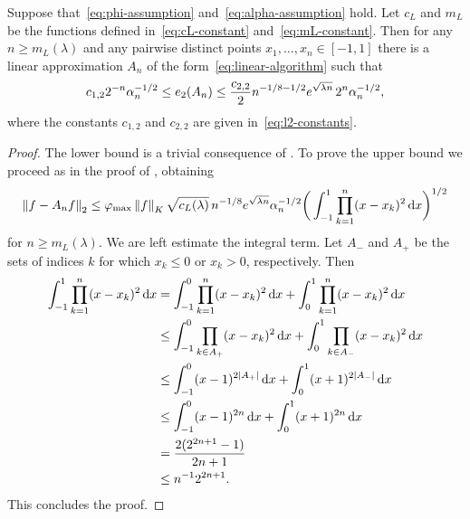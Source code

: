 \documentclass{mcom-l}
\numberwithin{equation}{section}
\numberwithin{theorem}{section} %
\begin{document}
\begin{theorem} \label{thm:e-any-L2}
  Suppose that~\eqref{eq:phi-assumption} and~\eqref{eq:alpha-assumption} hold.
  Let $c_L$ and $m_L$ be the functions defined in~\eqref{eq:cL-constant} and~\eqref{eq:mL-constant}.
  Then for any $n \geq m_L(\lambda)$ and any pairwise distinct points $x_1, \ldots, x_n \in [-1, 1]$ there is a linear approximation $A_n$ of the form~\eqref{eq:linear-algorithm} such that
  \begin{equation*}
    c_{1,2} 2^{-n} \alpha_n^{-1/2} \leq e_2(A_n) \leq  \frac{c_{2,2}}{2} n^{-1/8 - 1/2} e^{\sqrt{\smash[b]{\lambda n}}} \, 2^{n} \alpha_n^{-1/2},
  \end{equation*}
  where the constants $c_{1,2}$ and $c_{2,2}$ are given in~\eqref{eq:l2-constants}.
\end{theorem}
\begin{proof}
  The lower bound is a trivial consequence of .
  To prove the upper bound we proceed as in the proof of , obtaining
  \begin{equation*}
    \norm[0]{ f - A_n f }_{2} \leq \varphi_{\max} \norm[0]{f}_K \sqrt{c_L(\lambda)} \, n^{-1/8} e^{\sqrt{\smash[b]{\lambda n}}} \alpha_n^{-1/2} \bigg( \int_{-1}^1 \prod_{k=1}^n (x - x_k)^2 \dif x \bigg)^{1/2}
  \end{equation*}
  for $n \geq m_L(\lambda)$.
  We are left estimate the integral term.
  Let $A_-$ and $A_+$ be the sets of indices $k$ for which $x_k \leq 0$ or $x_k > 0$, respectively.
  Then
  \begin{equation*}
    \begin{split}
      \int_{-1}^1 \prod_{k=1}^n (x - x_k)^2 \dif x &= \int_{-1}^0 \prod_{k=1}^n (x - x_k)^2 \dif x + \int_0^1 \prod_{k=1}^n (x - x_k)^2 \dif x \\
      &\leq \int_{-1}^0 \prod_{k \in A_+} (x - x_k)^2 \dif x + \int_0^1 \prod_{k \in A_-} (x - x_k)^2 \dif x \\
      &\leq \int_{-1}^0 (x - 1)^{2 \abs[0]{A_+}} \dif x + \int_{0}^1 (x + 1)^{2 \abs[0]{A_-}} \dif x \\
      &\leq \int_{-1}^0 (x - 1)^{2n} \dif x + \int_0^1 (x + 1)^{2n} \dif x \\
      &= \frac{2(2^{2n+1} - 1)}{2n + 1} \\
      &\leq n^{-1} 2^{2n + 1}.
      \end{split}
  \end{equation*}
  This concludes the proof.
\end{proof}
\end{document}
